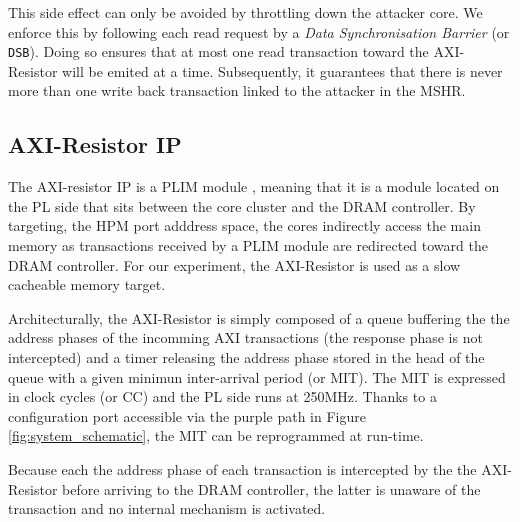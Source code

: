 
        This side effect can only be avoided by throttling down the attacker core. We enforce this by following each read request by a \emph{Data Synchronisation Barrier} (or \texttt{DSB}). Doing so ensures that at most one read transaction toward the AXI-Resistor will be emited at a time. Subsequently, it guarantees that there is never more than one write back transaction linked to the attacker in the MSHR.

    \subsection{AXI-Resistor IP}
        \label{subsec:axi-resistor}

        The AXI-resistor IP is a PLIM module \cite{PLIM20}, meaning that it is a module located on the PL side that sits between the core cluster and the DRAM controller. By targeting, the HPM port adddress space, the cores indirectly access the main memory as transactions received by a PLIM module are redirected toward the DRAM controller.  For our experiment, the AXI-Resistor is used as a slow cacheable memory target.

        Architecturally, the AXI-Resistor is simply composed of a queue buffering the the address phases of the incomming AXI transactions \cite{ARM-AXI} (the response phase is not intercepted) and a timer releasing the address phase stored in the head of the queue with a given minimun inter-arrival period (or MIT). The MIT is expressed in clock cycles (or CC) and the PL side runs at 250MHz. Thanks to a configuration port accessible via the purple path in Figure \ref{fig:system_schematic}, the MIT can be reprogrammed at run-time.

        Because each the address phase of each transaction is intercepted by the the AXI-Resistor before arriving to the DRAM controller, the latter is unaware of the transaction and no internal mechanism is activated.
